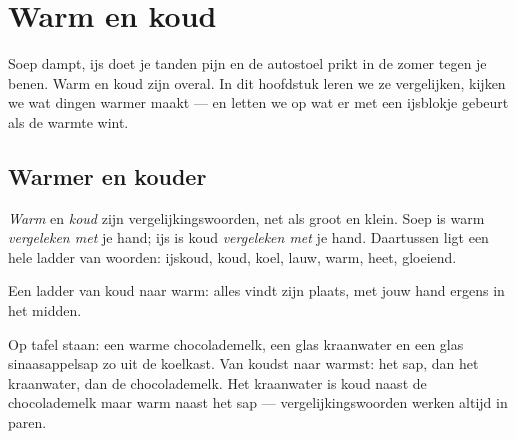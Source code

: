 \chapter{Warm en koud}\label{ch:g1:hot-and-cold}

Soep dampt, ijs doet je tanden pijn en de autostoel prikt in de zomer
tegen je benen. Warm en koud zijn overal. In dit hoofdstuk leren we ze
vergelijken, kijken we wat dingen warmer maakt --- en letten we op wat
er met een ijsblokje gebeurt als de warmte wint.

\section{Warmer en kouder}

\begin{definition}\label{def:g1:hot-and-cold:words}
\emph{Warm} en \emph{koud} zijn
vergelijkingswoorden, net als groot en klein. Soep is warm
\emph{vergeleken met} je hand; ijs is koud \emph{vergeleken met} je
hand. Daartussen ligt een hele ladder van woorden: ijskoud, koud,
koel, lauw, warm, heet, gloeiend.
\end{definition}

\begin{omfigure}

{\small Een ladder van koud naar warm: alles vindt zijn plaats, met
jouw hand ergens in het midden.}
\end{omfigure}

\begin{example}\label{ex:g1:hot-and-cold:drinks}
Op tafel staan: een warme chocolademelk, een glas kraanwater en een
glas sinaasappelsap zo uit de koelkast. Van koudst naar warmst: het
sap, dan het kraanwater, dan de chocolademelk. Het kraanwater is koud
naast de chocolademelk maar warm naast het sap ---
vergelijkingswoorden werken altijd in paren.
\end{example}

